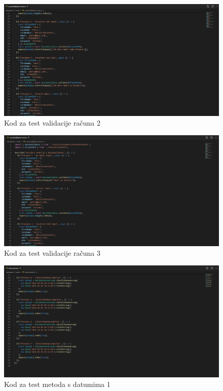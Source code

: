 			\begin{figure}[H]
				\includegraphics[width=1\linewidth]{images/RacunValidator2.png}
				\caption{Kod za test validacije računa 2}
				\label{fig:RacunValidator - kod2} 
			\end{figure}
			
			\begin{figure}[H]
				\includegraphics[width=1\linewidth]{images/RacunValidator3.png}
				\caption{Kod za test validacije računa 3}
				\label{fig:RacunValidator - kod3} 
			\end{figure}
			
			\begin{figure}[H]
				\includegraphics[width=1\linewidth]{images/Times1.png}
				\caption{Kod za test metoda s datumima 1}
				\label{fig:Times - kod1} 
			\end{figure}
			
